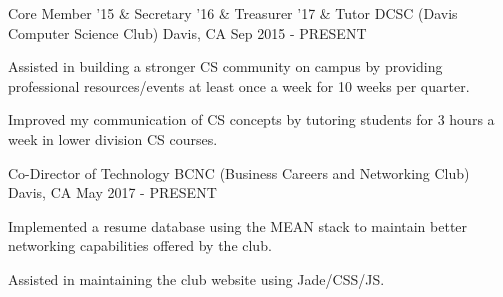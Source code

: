 

\begin{cventries}

  \cventry
    {Core Member '15 \& Secretary '16 \& Treasurer '17 \& Tutor} %
    {DCSC (Davis Computer Science Club)} %
    {Davis, CA} %
    {Sep 2015 - PRESENT} %
    {
      \begin{cvitems} %
        \item {Assisted in building a stronger CS community on campus by providing professional resources/events at least once a week for 10 weeks per quarter.}
        \item {Improved my communication of CS concepts by tutoring students for 3 hours a week in lower division CS courses.}
      \end{cvitems}
    }

  \cventry
    {Co-Director of Technology} %
    {BCNC (Business Careers and Networking Club)} %
    {Davis, CA} %
    {May 2017 - PRESENT} %
    {
      \begin{cvitems} %
        \item {Implemented a resume database using the MEAN stack to maintain better networking capabilities offered by the club.}
        \item {Assisted in maintaining the club website using Jade/CSS/JS.}
      \end{cvitems}
    }

\end{cventries}
